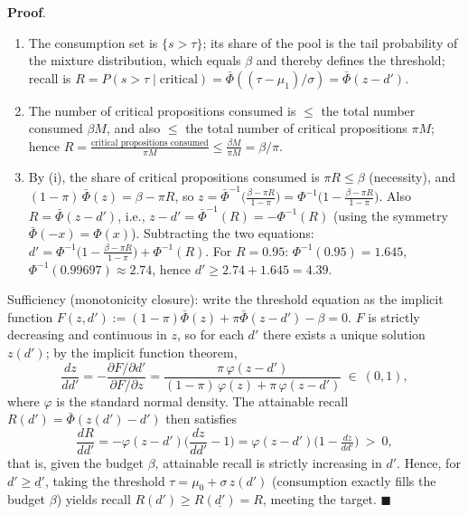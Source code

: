 \documentclass[
  11pt]{article}
\begin{document}
\textbf{Proof}.

\begin{enumerate}
\def\labelenumi{(\roman{enumi})}
\item
  The consumption set is \(\{s > \tau\}\); its share of the pool is the
  tail probability of the mixture distribution, which equals \(\beta\)
  and thereby defines the threshold; recall is
  \(R = P(s > \tau \mid \text{critical}) = \bar\Phi((\tau - \mu_1)/\sigma) = \bar\Phi(z - d')\).
\item
  The number of critical propositions consumed is \(\le\) the total
  number consumed \(\beta M\), and also \(\le\) the total number of
  critical propositions \(\pi M\); hence
  \(R = \frac{\text{critical propositions consumed}}{\pi M} \le \frac{\beta M}{\pi M} = \beta/\pi\).
\item
  By (i), the share of critical propositions consumed is
  \(\pi R \le \beta\) (necessity), and
  \((1-\pi)\,\bar\Phi(z) = \beta - \pi R\), so
  \(z = \bar\Phi^{-1}\big(\tfrac{\beta-\pi R}{1-\pi}\big) = \Phi^{-1}\big(1-\tfrac{\beta-\pi R}{1-\pi}\big)\).
  Also \(R = \bar\Phi(z - d')\), i.e.,
  \(z - d' = \bar\Phi^{-1}(R) = -\Phi^{-1}(R)\) (using the symmetry
  \(\bar\Phi(-x) = \Phi(x)\)). Subtracting the two equations:
  \(d' = \Phi^{-1}\big(1-\tfrac{\beta-\pi R}{1-\pi}\big) + \Phi^{-1}(R)\).
  For \(R = 0.95\): \(\Phi^{-1}(0.95) = 1.645\),
  \(\Phi^{-1}(0.99697) \approx 2.74\), hence
  \(d' \ge 2.74 + 1.645 = 4.39\).
\end{enumerate}

Sufficiency (monotonicity closure): write the threshold equation as the
implicit function
\(F(z, d') := (1-\pi)\bar\Phi(z) + \pi\bar\Phi(z - d') - \beta = 0\).
\(F\) is strictly decreasing and continuous in \(z\), so for each \(d'\)
there exists a unique solution \(z(d')\); by the implicit function
theorem,
\[\frac{dz}{dd'} = -\frac{\partial F/\partial d'}{\partial F/\partial z} = \frac{\pi\,\varphi(z-d')}{(1-\pi)\,\varphi(z) + \pi\,\varphi(z-d')} \ \in\ (0,1),\]
where \(\varphi\) is the standard normal density. The attainable recall
\(R(d') = \bar\Phi(z(d') - d')\) then satisfies
\[\frac{dR}{dd'} = -\varphi(z-d')\Big(\frac{dz}{dd'} - 1\Big) = \varphi(z-d')\big(1 - \tfrac{dz}{dd'}\big) \ >\ 0,\]
that is, given the budget \(\beta\), attainable recall is strictly
increasing in \(d'\). Hence, for \(d' \ge \underline{d'}\), taking the
threshold \(\tau = \mu_0 + \sigma\, z(d')\) (consumption exactly fills
the budget \(\beta\)) yields recall \(R(d') \ge R(\underline{d'}) = R\),
meeting the target. \(\blacksquare\)
\end{document}
